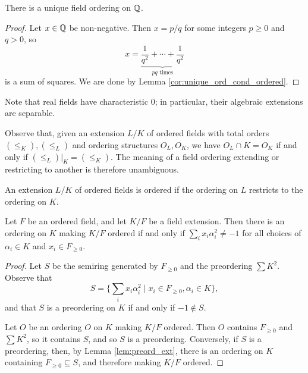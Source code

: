 \begin{corollary}
  \label{cor:unique_ord_Q}
  \leanok
  There is a unique field ordering on $\mathbb{Q}$.
\end{corollary}
\begin{proof}
  \leanok
  Let $x\in\mathbb{Q}$ be non-negative. Then $x=p/q$ for some integers $p\geq0$ and $q>0$, so 
  \[x=\underbrace{\frac{1}{q^2}+\cdots+\frac{1}{q^2}}_{pq\text{ times}}\]
  is a sum of squares. We are done by Lemma \ref{cor:unique_ord_cond_ordered}.
\end{proof}

Note that real fields have characteristic 0; in particular, their algebraic extensions are separable.

Observe that, given an extension $L/K$ of ordered fields with total orders $(\leq_K),(\leq_L)$ and ordering structures $O_L,O_K$, we have $O_L\cap K=O_K$ if and only if $(\leq_L)|_K=(\leq_K)$. The meaning of a field ordering extending or restricting to another is therefore unambiguous.

\begin{definition}
  \label{def:ordered_ext}
  \leanok
  An extension $L/K$ of ordered fields is ordered if the ordering on $L$ restricts to the ordering on $K$.
\end{definition}

\begin{lemma}
  \label{lem:ext_ord_cond}
  Let $F$ be an ordered field, and let $K/F$ be a field extension. Then there is an ordering on $K$ making $K/F$ ordered if and only if $\sum_i x_i\alpha_i^2\neq-1$ for all choices of $\alpha_i\in K$ and $x_i\in F_{\geq0}$.
\end{lemma}
\begin{proof}
  Let $S$ be the semiring generated by $F_{\geq0}$ and the preordering $\sum K^2$. Observe that
  \[S=\{\sum_i x_i\alpha_i^2\mid x_i\in F_{\geq0},\alpha_i\in K\},\]
  and that $S$ is a preordering on $K$ if and only if $-1\notin S$.

  Let $O$ be an ordering $O$ on $K$ making $K/F$ ordered. Then $O$ contains $F_{\geq0}$ and $\sum K^2$, so it contains $S$, and so $S$ is a preordering. Conversely, if $S$ is a preordering, then, by Lemma \ref{lem:preord_ext}, there is an ordering on $K$ containing $F_{\geq0}\subseteq S$, and therefore making $K/F$ ordered.
\end{proof}

